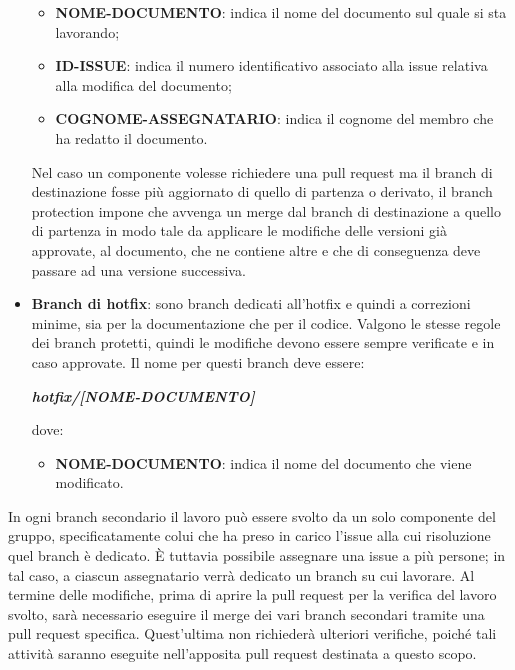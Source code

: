 \begin{itemize}
            \begin{itemize}
                \item \textbf{NOME-DOCUMENTO}: indica il nome del documento sul quale si sta lavorando;
                \item \textbf{ID-ISSUE}: indica il numero identificativo associato alla issue relativa alla modifica del documento;
                \item \textbf{COGNOME-ASSEGNATARIO}: indica il cognome del membro che ha redatto il documento.
            \end{itemize}
            Nel caso un componente volesse richiedere una pull request ma il branch di destinazione fosse più aggiornato di quello di partenza o derivato, il branch protection
            impone che avvenga un merge dal branch di destinazione a quello di partenza in modo tale da applicare le modifiche delle versioni già approvate, al documento, che ne contiene
            altre e che di conseguenza deve passare ad una versione successiva.
            \item \textbf{Branch di hotfix}: sono branch dedicati all'hotfix e quindi a correzioni minime, sia per la documentazione che per il codice. Valgono le stesse regole dei
            branch protetti, quindi le modifiche devono essere sempre verificate e in caso approvate.
            Il nome per questi branch deve essere:
            \begin{center}
                \textbf{\textit{hotfix/[NOME-DOCUMENTO]}}
            \end{center}
            dove:

            \begin{itemize}
                \item \textbf{NOME-DOCUMENTO}: indica il nome del documento che viene modificato.
            \end{itemize}
        \end{itemize}

        In ogni branch secondario il lavoro può essere svolto da un solo componente del gruppo, specificatamente colui che ha preso in carico l'issue alla cui risoluzione quel branch è dedicato.
        È tuttavia possibile assegnare una issue a più persone; in tal caso, a ciascun assegnatario verrà dedicato un branch su cui lavorare. Al termine delle modifiche, prima di aprire la pull request 
        per la verifica del lavoro svolto, sarà necessario eseguire il merge dei vari branch secondari tramite una pull request specifica. Quest'ultima non richiederà ulteriori verifiche, poiché tali attività
        saranno eseguite nell'apposita pull request destinata a questo scopo.
    

